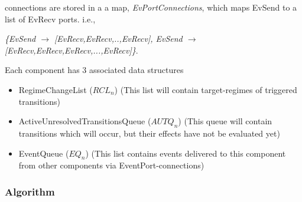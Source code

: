 \documentclass{article}
\newcommand{\EventPort}{{\bf{EventPort}}\xspace}
\begin{document}
\noindent \EventPort connections are stored in a a map,
\textsl{EvPortConnections}, which maps EvSend to a list of EvRecv ports. i.e.,

\textsl{\{EvSend $\rightarrow$ [EvRecv,EvRecv,..,EvRecv], EvSend $\rightarrow$
[EvRecv,EvRecv,EvRecv,...,EvRecv]\}}.

\newcommand{\RCLn}{$RCL_n$}
\newcommand{\AUTQn}{$AUTQ_n$}
\newcommand{\EQn}{$EQ_n$}

\noindent Each component has 3 associated data structures
\begin{itemize}
\item RegimeChangeList (\RCLn) (This list will contain target-regimes of
triggered transitions)
\item ActiveUnresolvedTransitionsQueue (\AUTQn) (This queue will
contain transitions which will occur, but their effects have not be
evaluated yet)
\item EventQueue (\EQn) (This list contains events delivered to this
component from other components via EventPort-connections)
\end{itemize}

\subsubsection{Algorithm}
\end{document}
